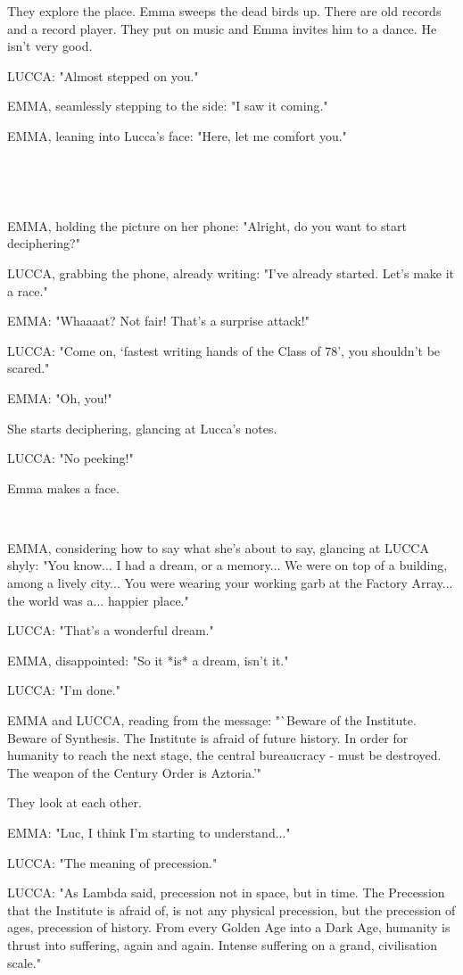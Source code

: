 \documentclass[11pt]{article}
\begin{document}
They explore the place.
Emma sweeps the dead birds up.
There are old records and a record player.
They put on music and Emma invites him to a dance.
He isn't very good. 

LUCCA: "Almost stepped on you."

EMMA, seamlessly stepping to the side: "I saw it coming."

EMMA, leaning into Lucca's face: "Here, let me comfort you."

\ 

\ 

EMMA, holding the picture on her phone: "Alright, do you want to start deciphering?"

LUCCA, grabbing the phone, already writing: "I've already started. Let's make it a race."

EMMA: "Whaaaat? Not fair! That's a surprise attack!"

LUCCA: "Come on, `fastest writing hands of the Class of 78', you shouldn't be scared."

EMMA: "Oh, you!"

She starts deciphering, glancing at Lucca's notes.

LUCCA: "No peeking!" 

Emma makes a face.

\ 

EMMA, considering how to say what she's about to say, glancing at LUCCA shyly: "You know...
I had a dream, or a memory...
We were on top of a building, among a lively city...
You were wearing your working garb at the Factory Array...
the world was a... happier place."

LUCCA: "That's a wonderful dream."

EMMA, disappointed: "So it *is* a dream, isn't it."

LUCCA: "I'm done."

EMMA and LUCCA, reading from the message: "`Beware of the Institute. 
Beware of Synthesis.
The Institute is afraid of future history.
In order for humanity to reach the next stage, the central bureaucracy - must be destroyed.
The weapon of the Century Order is Aztoria.'"

They look at each other.

EMMA: "Luc, I think I'm starting to understand..."

LUCCA: "The meaning of precession."

LUCCA: "As Lambda said, precession not in space, but in time.
The Precession that the Institute is afraid of, is not any physical precession, but the precession of ages, precession of history.
From every Golden Age into a Dark Age, humanity is thrust into suffering, again and again.
Intense suffering on a grand, civilisation scale."
\end{document}
